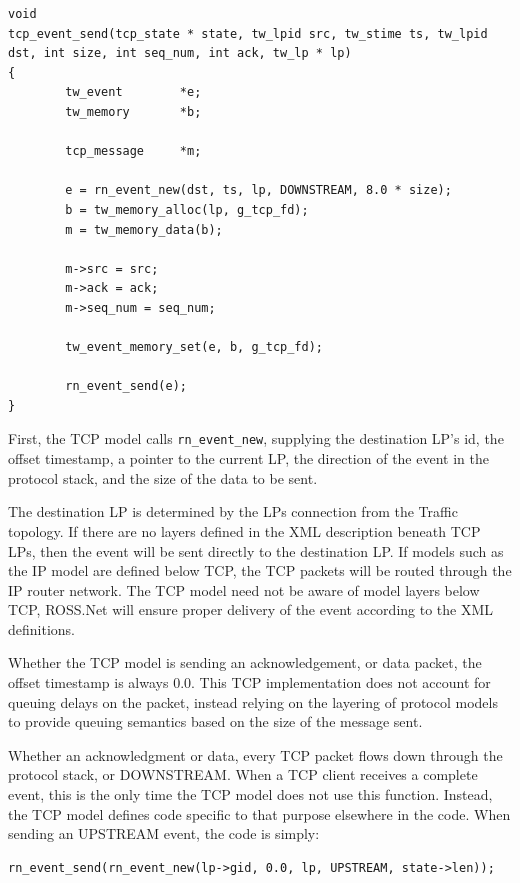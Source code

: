 \documentclass[12pt]{article}
\begin{document}
\begin{small}
\begin{verbatim}
void
tcp_event_send(tcp_state * state, tw_lpid src, tw_stime ts, tw_lpid dst, int size, int seq_num, int ack, tw_lp * lp)
{
        tw_event        *e;
        tw_memory       *b;

        tcp_message     *m;

        e = rn_event_new(dst, ts, lp, DOWNSTREAM, 8.0 * size);
        b = tw_memory_alloc(lp, g_tcp_fd);
        m = tw_memory_data(b);

        m->src = src;
        m->ack = ack;
        m->seq_num = seq_num;

        tw_event_memory_set(e, b, g_tcp_fd);

        rn_event_send(e);
}
\end{verbatim}
\end{small}

First, the TCP model calls {\tt rn\_event\_new}, supplying the destination
LP's id, the offset timestamp, a pointer to the current LP, the direction of
the event in the protocol stack, and the size of the data to be sent.

The destination LP is determined by the LPs connection from the Traffic
topology.  If there are no layers defined in the XML description beneath TCP
LPs, then the event will be sent directly to the destination LP.  If models
such as the IP model are defined below TCP, the TCP packets will be routed
through the IP router network.  The TCP model need not be aware of model
layers below TCP, ROSS.Net will ensure proper delivery of the event according
to the XML definitions.

Whether the TCP model is sending an acknowledgement, or data packet, the
offset timestamp is always 0.0.  This TCP implementation does not account for
queuing delays on the packet, instead relying on the layering of protocol
models to provide queuing semantics based on the size of the message sent.

Whether an acknowledgment or data, every TCP packet flows down through the
protocol stack, or DOWNSTREAM.  When a TCP client receives a complete event,
this is the only time the TCP model does not use this function.  Instead, the
TCP model defines code specific to that purpose elsewhere in the code.  When
sending an UPSTREAM event, the code is simply:

\begin{small}\begin{verbatim}
rn_event_send(rn_event_new(lp->gid, 0.0, lp, UPSTREAM, state->len));
\end{verbatim}\end{small}
\end{document}
